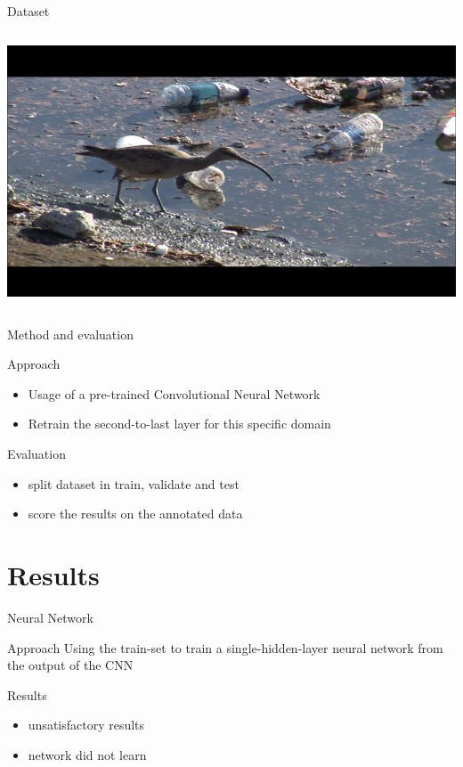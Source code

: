 \documentclass{beamer}
\begin{document}
\begin{frame}{Dataset}
\begin{columns}[c]
\begin{column}{.4\textwidth}
                \includegraphics[width=\textwidth]{images/9077_11.jpg}\\
            \end{column}
        \end{columns}
    \end{frame}
    
    \begin{frame}{Method and evaluation}
        \begin{block}{Approach}
            \begin{itemize}
            \item Usage of a pre-trained Convolutional Neural Network
            \item Retrain the second-to-last layer for this specific domain
            \end{itemize}
        \end{block}
        \begin{block}{Evaluation}
            \begin{itemize}
            \item split dataset in train, validate and test
            \item score the results on the annotated data
            \end{itemize}
        \end{block}
    \end{frame}
\section{Results}
    \begin{frame}{Neural Network}
    \begin{block}{Approach}
        Using the train-set to train a single-hidden-layer neural network from the output of the CNN
    \end{block}
    \begin{block}{Results}
        \begin{itemize}
        \pause
        \item unsatisfactory results
        \item network did not learn
        \end{itemize}
    \end{block}
    \end{frame}
    
\end{document}
